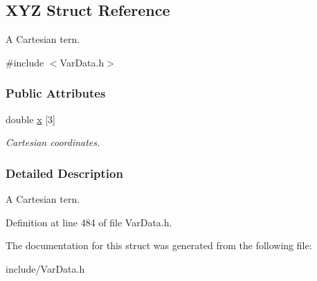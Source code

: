 \hypertarget{structXYZ}{}\subsection{X\+YZ Struct Reference}
\label{structXYZ}


A Cartesian tern.  




{\ttfamily \#include $<$Var\+Data.\+h$>$}

\subsubsection*{Public Attributes}
\begin{DoxyCompactItemize}
\item 
double \hyperlink{structXYZ_a8639a6dd4fb3c4aa452b708733d827b4}{x} \mbox{[}3\mbox{]}\hypertarget{structXYZ_a8639a6dd4fb3c4aa452b708733d827b4}{}\label{structXYZ_a8639a6dd4fb3c4aa452b708733d827b4}

\begin{DoxyCompactList}\small\item\em Cartesian coordinates. \end{DoxyCompactList}\end{DoxyCompactItemize}


\subsubsection{Detailed Description}
A Cartesian tern. 

Definition at line 484 of file Var\+Data.\+h.



The documentation for this struct was generated from the following file\+:\begin{DoxyCompactItemize}
\item 
include/Var\+Data.\+h\end{DoxyCompactItemize}
